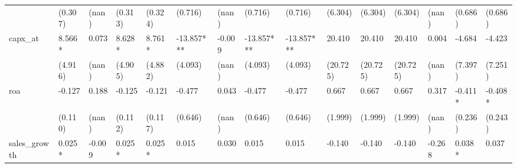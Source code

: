 \begin{table}
\begin{center}
\begin{tabular}{lllllllllllllll}
                  & (0.307)            & (nan)              & (0.313)                & (0.324)             & (0.716)              & (nan)                & (0.716)                  & (0.716)               & (6.304)              & (6.304)                  & (6.304)               & (nan)                         & (0.686)                                   & (0.686)                                 \\
capx\_at          & 8.566*             & 0.073              & 8.628*                 & 8.761*              & -13.857***           & -0.009               & -13.857***               & -13.857***            & 20.410               & 20.410                   & 20.410                & 0.004                         & -4.684                                    & -4.423                                  \\
                  & (4.916)            & (nan)              & (4.905)                & (4.882)             & (4.093)              & (nan)                & (4.093)                  & (4.093)               & (20.725)             & (20.725)                 & (20.725)              & (nan)                         & (7.397)                                   & (7.251)                                 \\
roa               & -0.127             & 0.188              & -0.125                 & -0.121              & -0.477               & 0.043                & -0.477                   & -0.477                & 0.667                & 0.667                    & 0.667                 & 0.317                         & -0.411*                                   & -0.408*                                 \\
                  & (0.110)            & (nan)              & (0.112)                & (0.117)             & (0.646)              & (nan)                & (0.646)                  & (0.646)               & (1.999)              & (1.999)                  & (1.999)               & (nan)                         & (0.236)                                   & (0.243)                                 \\
sales\_growth     & 0.025*             & -0.009             & 0.025*                 & 0.025*              & 0.015                & 0.030                & 0.015                    & 0.015                 & -0.140               & -0.140                   & -0.140                & -0.268                        & 0.038*                                    & 0.037                                   \\

\end{tabular}
\end{center}
\end{table}
